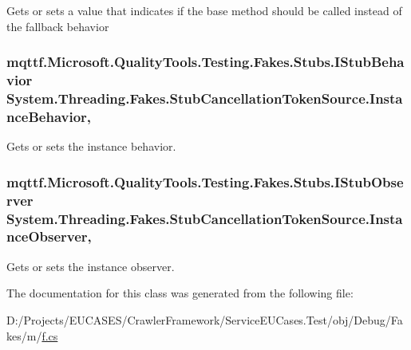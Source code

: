 Gets or sets a value that indicates if the base method should be called instead of the fallback behavior

\hypertarget{class_system_1_1_threading_1_1_fakes_1_1_stub_cancellation_token_source_af9475857ea83201de134cf011e4c2e75}{
\subsubsection[{Instance\-Behavior}]{\setlength{\rightskip}{0pt plus 5cm}mqttf.\-Microsoft.\-Quality\-Tools.\-Testing.\-Fakes.\-Stubs.\-I\-Stub\-Behavior System.\-Threading.\-Fakes.\-Stub\-Cancellation\-Token\-Source.\-Instance\-Behavior\hspace{0.3cm}{\ttfamily [get]}, {\ttfamily [set]}}}\label{class_system_1_1_threading_1_1_fakes_1_1_stub_cancellation_token_source_af9475857ea83201de134cf011e4c2e75}


Gets or sets the instance behavior.

\hypertarget{class_system_1_1_threading_1_1_fakes_1_1_stub_cancellation_token_source_a2c1f498891df7fab7c35176ee922ce0a}{
\subsubsection[{Instance\-Observer}]{\setlength{\rightskip}{0pt plus 5cm}mqttf.\-Microsoft.\-Quality\-Tools.\-Testing.\-Fakes.\-Stubs.\-I\-Stub\-Observer System.\-Threading.\-Fakes.\-Stub\-Cancellation\-Token\-Source.\-Instance\-Observer\hspace{0.3cm}{\ttfamily [get]}, {\ttfamily [set]}}}\label{class_system_1_1_threading_1_1_fakes_1_1_stub_cancellation_token_source_a2c1f498891df7fab7c35176ee922ce0a}


Gets or sets the instance observer.



The documentation for this class was generated from the following file\-:\begin{DoxyCompactItemize}
\item 
D\-:/\-Projects/\-E\-U\-C\-A\-S\-E\-S/\-Crawler\-Framework/\-Service\-E\-U\-Cases.\-Test/obj/\-Debug/\-Fakes/m/\hyperlink{m_2f_8cs}{f.\-cs}\end{DoxyCompactItemize}
